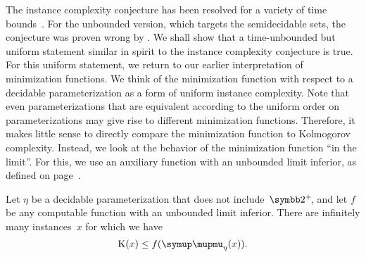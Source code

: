 The instance complexity conjecture has been resolved for a variety of time bounds~\parencite{fortnow1996resource,buhrman1996random}.
For the unbounded version, which targets the semidecidable sets, the conjecture was proven wrong by \textcite{kummer1996kolmogorov}.
We shall show that a time-unbounded but uniform statement similar in spirit to the instance complexity conjecture is true.
For this uniform statement, we return to our earlier interpretation of minimization functions.
We think of the minimization function with respect to a decidable parameterization as a form of uniform instance complexity.
Note that even parameterizations that are equivalent according to the uniform order on parameterizations may give rise to different minimization functions.
Therefore, it makes little sense to directly compare the minimization function to Kolmogorov complexity.
Instead, we look at the behavior of the minimization function \enquote{in the limit}.
For this, we use an auxiliary function with an unbounded limit inferior, as defined on page~\pageref{def:liminf}.
\begin{theorem}
\label{thm:parameterizedicc}%
  Let $\eta$ be a decidable parameterization that does not include~$\binary^+\!$, and let $f$ be any computable function with an unbounded limit inferior.
  There are infinitely many instances~$x$ for which we have
  \begin{equation*}
    \KC(x) \le f(\mu_\eta(x)).
  \end{equation*}
\end{theorem}
